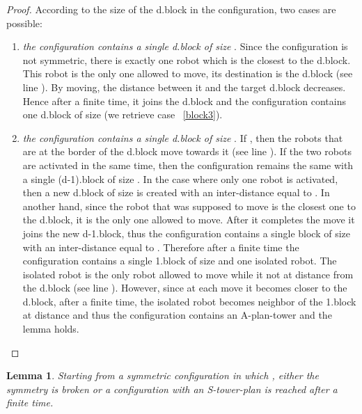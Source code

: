 \documentclass[12pt]{llncs}
\newtheorem{lem}{Lemma}
\begin{document}
\begin{proof}
According to the size of the d.block in the configuration, two cases are possible:
\begin{enumerate} 
\item{\textit{the configuration contains a single d.block of size }}. Since the configuration is not symmetric, there is exactly one robot which is the closest to the d.block. This robot is the only one allowed to move, its destination is the d.block (see line ). By moving, the distance between it and the target d.block decreases. Hence after a finite time, it joins the d.block and the configuration contains one d.block of size  (we retrieve case ~\ref{block3}).
\item\label{block3}{\textit{the configuration contains a single d.block of size }}. If , then the robots that are at the border of the d.block move towards it (see line ). If the two robots are activated in the same time, then the configuration remains the same with a single (d-1).block of size . In the case where only one robot is activated, then a new d.block of size  is created with an inter-distance equal to . In another hand, since the robot that was supposed to move is the closest one to the d.block, it is the only one allowed to move. After it completes the move it joins the new d-1.block, thus the configuration contains a single block of size  with an inter-distance equal to . Therefore after a finite time the configuration contains a single 1.block of size  and one isolated robot. The isolated robot is the only robot allowed to move while it not at distance  from the d.block (see line ). However, since at each move it becomes closer to the d.block, after a finite time, the isolated robot becomes neighbor of the 1.block at distance  and thus the configuration contains an A-plan-tower and the lemma holds.
\end{enumerate} 
\end{proof}
\begin{lem}
\label{lem:EvsOd}
Starting from a symmetric configuration in which , either the symmetry is broken or a configuration with an S-tower-plan is reached after a finite time. 
\end{lem}
\end{document}

